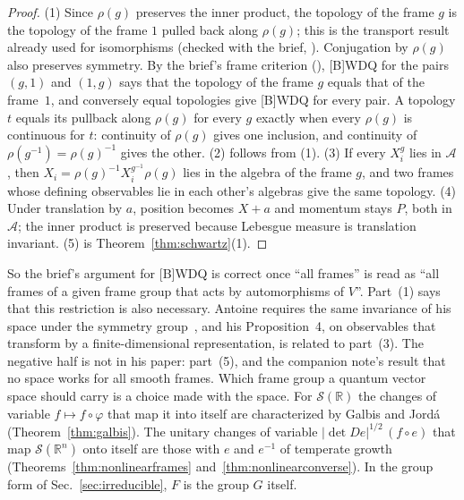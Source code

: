 \documentclass[11pt]{article}
\theoremstyle{definition}
\begin{document}
\begin{proof}
  (1) Since $\rho(g)$ preserves the inner product, the topology of the frame $g$ is the topology
  of the frame $1$ pulled back along $\rho(g)$; this is the transport result already used for
  isomorphisms (checked with the brief, ).
  Conjugation by $\rho(g)$ also preserves symmetry. By the brief's frame criterion
  (), [B]WDQ for the pairs $(g, 1)$ and
  $(1, g)$ says that the topology of the frame $g$ equals that of the frame~$1$, and conversely
  equal topologies give [B]WDQ for every pair. A topology $t$ equals its pullback along
  $\rho(g)$ for every $g$ exactly when every $\rho(g)$ is continuous for $t$: continuity of
  $\rho(g)$ gives one inclusion, and continuity of $\rho(g^{-1}) = \rho(g)^{-1}$ gives the other.
  (2) follows from (1). (3) If every $X_i^g$ lies in $\mathcal A$, then
  $X_i = \rho(g)^{-1}X_i^{g^{-1}}\rho(g)$ lies in the algebra of the frame $g$, and two frames whose
  defining observables lie in each other's algebras give the same topology. (4) Under translation by
  $a$, position becomes $X + a$ and momentum stays $P$, both in $\mathcal A$; the inner product is
  preserved because Lebesgue measure is translation invariant. (5) is
  Theorem~\ref{thm:schwartz}(1).
\end{proof}

So the brief's argument for [B]WDQ is correct once ``all frames'' is read as ``all frames of a
given frame group that acts by automorphisms of $V$''. Part~(1) says that this restriction is
also necessary. Antoine requires the same invariance of his space under the symmetry
group~\cite[Sec.~II]{antoine2}, and his Proposition~4, on observables that transform by a
finite-dimensional representation, is related to part~(3). The negative half is not in his paper:
part~(5), and the companion note's result that no space works for all smooth frames. Which frame
group a quantum vector space should carry is a choice made with the space. For
$\mathcal S(\mathbb R)$ the changes of variable $f \mapsto f \circ \varphi$ that map it into itself
are characterized by Galbis and Jordá~\cite[Thm.~2.3]{galbis} (Theorem~\ref{thm:galbis}). The unitary changes of variable
$|\det De|^{1/2}\,(f \circ e)$ that map $\mathcal S(\mathbb R^n)$ onto itself are those with $e$ and
$e^{-1}$ of temperate growth (Theorems~\ref{thm:nonlinearframes}
and~\ref{thm:nonlinearconverse}). In the group
form of Sec.~\ref{sec:irreducible}, $F$ is the group $G$ itself.
\end{document}

